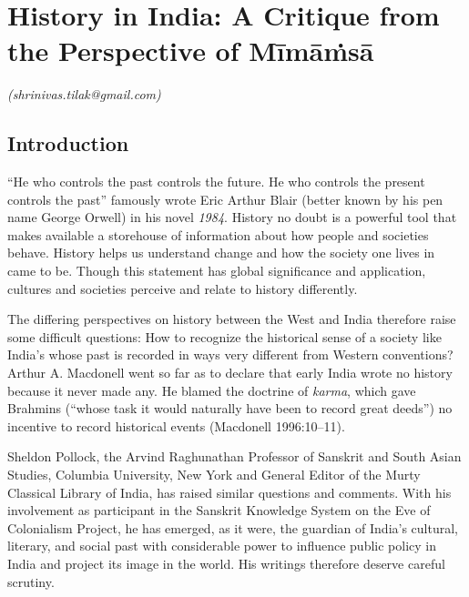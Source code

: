 
\chapter{History in India: A Critique from the Perspective of Mīmāṁsā}\label{chapter1}


\begin{flushright}
\textit{(shrinivas.tilak@gmail.com)}
\end{flushright}


\section*{Introduction}

“He who controls the past controls the future. He who controls the present controls the past” famously wrote Eric Arthur Blair (better known by his pen name George Orwell) in his novel \textit{1984}. History no doubt is a powerful tool that makes available a storehouse of information about how people and societies behave. History helps us understand change and how the society one lives in came to be. Though this statement has global significance and application, cultures and societies perceive and relate to history differently.

The differing perspectives on history between the West and India therefore raise some difficult questions: How to recognize the historical sense of a society like India’s whose past is recorded in ways very different from Western conventions? Arthur A. Macdonell went so far as to declare that early India wrote no history because it never made any. He blamed the doctrine of \textit{karma}, which gave Brahmins (“whose task it would naturally have been to record great deeds”) no incentive to record historical events (Macdonell 1996:10–11).

Sheldon Pollock, the Arvind Raghunathan Professor of Sanskrit and South Asian Studies, Columbia University, New York and General Editor of the Murty Classical Library of India, has raised similar questions and comments. With his involvement as participant in the Sanskrit Knowledge System on the Eve of Colonialism Project, he has emerged, as it were, the guardian of India’s cultural, literary, and social past with considerable power to influence public policy in India and project its image in the world. His writings therefore deserve careful scrutiny.


